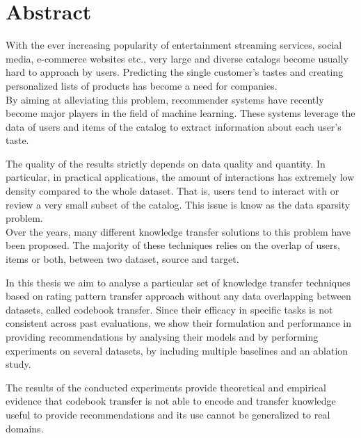 \chapter*{Abstract}

With the ever increasing popularity of entertainment streaming services, social media, e-commerce websites etc., very large and diverse catalogs become usually hard to approach by users. Predicting the single customer's tastes and creating personalized lists of products has become a need for companies.\\
By aiming at alleviating this problem, recommender systems have recently become major players in the field of machine learning. These systems leverage the data of users and items of the catalog to extract information about each user's taste.\par
The quality of the results strictly depends on data quality and quantity. In particular, in practical applications, the amount of interactions has extremely low density compared to the whole dataset. That is, users tend to interact with or review a very small subset of the catalog. This issue is know as the data sparsity problem.\\
Over the years, many different knowledge transfer solutions to this problem have been proposed. The majority of these techniques relies on the overlap of users, items or both, between two dataset, source and target.\par
In this thesis we aim to analyse a particular set of knowledge transfer techniques based on rating pattern transfer approach without any data overlapping between datasets, called codebook transfer. Since their efficacy in specific tasks is not consistent across past evaluations, we show their formulation and performance in providing recommendations by analysing their models and by performing experiments on several datasets, by including multiple baselines and an ablation study.\par
The results of the conducted experiments provide theoretical and empirical evidence that codebook transfer is not able to encode and transfer knowledge useful to provide recommendations and its use cannot be generalized to real domains.